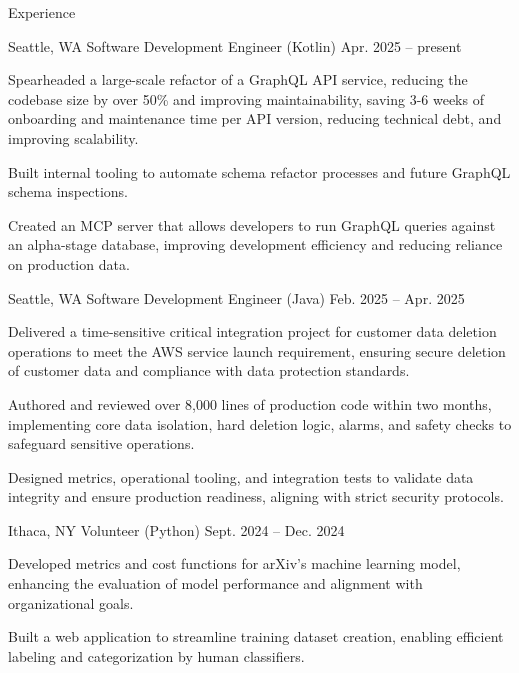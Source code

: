 \documentclass[10pt]{article}
\begin{document}
\pagestyle{empty}


\begin{customsection}{Experience}

    {Seattle, WA}
    {Software Development Engineer (Kotlin)}
    {Apr. 2025 -- present}
    {
        \item Spearheaded a large-scale refactor of a GraphQL API service, reducing the codebase size by over 50\% and improving maintainability, saving 3-6 weeks of onboarding and maintenance time per API version, reducing technical debt, and improving scalability.
        \item Built internal tooling to automate schema refactor processes and future GraphQL schema inspections.
        \item Created an MCP server that allows developers to run GraphQL queries against an alpha-stage database, improving development efficiency and reducing reliance on production data.
    }

    {Seattle, WA}
    {Software Development Engineer (Java)}
    {Feb. 2025 -- Apr. 2025}
    {
        \item Delivered a time-sensitive critical integration project for customer data deletion operations to meet the AWS service launch requirement, ensuring secure deletion of customer data and compliance with data protection standards.
        \item Authored and reviewed over 8,000 lines of production code within two months, implementing core data isolation, hard deletion logic, alarms, and safety checks to safeguard sensitive operations.
        \item Designed metrics, operational tooling, and integration tests to validate data integrity and ensure production readiness, aligning with strict security protocols.
    }

    {Ithaca, NY}
    {Volunteer (Python)}
    {Sept. 2024 -- Dec. 2024}
    {
        \item Developed metrics and cost functions for arXiv's machine learning model, enhancing the evaluation of model performance and alignment with organizational goals.
        \item Built a web application to streamline training dataset creation, enabling efficient labeling and categorization by human classifiers.
    }


\end{customsection}
\end{document}
